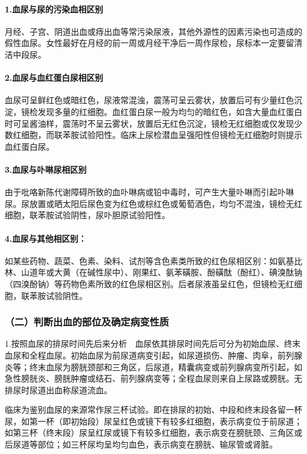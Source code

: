 \paragraph{1.血尿与尿的污染血相区别}

月经、子宫、阴道出血或痔出血等常污染尿液，其他外源性的因素污染也可造成的假性血尿。女性最好在月经的前一周或月经干净后一周作尿检，尿标本一定要留清洁中段尿。

\paragraph{2.血尿与血红蛋白尿相区别}

血尿可呈鲜红色或暗红色，尿液常混浊，震荡可呈云雾状，放置后可有少量红色沉淀，镜检发现多量的红细胞。血红蛋白尿一般为均匀的暗红色，如含大量血红蛋白时可呈酱油样，震荡时不呈云雾状，放置后无红色沉淀，镜检无红细胞或仅发现少数红细胞，而联苯胺试验阳性。临床上尿检潜血呈强阳性但镜检无红细胞时则提示血红蛋白尿。

\paragraph{3.血尿与卟啉尿相区别}

由于吡咯新陈代谢障碍所致的血卟啉病或铅中毒时，可产生大量卟啉而引起卟啉尿。尿放置或晒太阳后尿色变为红色或棕红色或葡萄酒色，均匀不混浊，镜检无红细胞，联苯胺试验阴性，尿卟胆原试验阳性。

\paragraph{4.血尿与其他相区别：}

如某些药物、蔬菜、色素、染料、试剂等含色素类所致的红色尿相区别：如氨基比林、山道年或大黄（在碱性尿中）、刚果红、氨苯磺胺、酚磺酞（酚红）、碘溴酞钠（四溴酚钠）等药物色素所致的红色尿相区别。后者尿液虽呈红色，但镜检无红细胞，联苯胺试验阴性。

\subsubsection{（二）判断出血的部位及确定病变性质}

1.按照血尿的排尿时间先后来分析　血尿依其排尿时间先后可分为初始血尿、终末血尿和全程血尿。初始血尿为前尿道病变引起，如尿道损伤、肿瘤、肉阜，前列腺炎等；终末血尿为膀胱颈部和三角区，后尿道，精囊病变或前列腺病变所引起，如急性膀胱炎、膀胱肿瘤或结石、前列腺病变等；全程血尿则来自上尿路或膀胱。无排尿时尿道出血称尿道流血。

临床为鉴别血尿的来源常作尿三杯试验。即在排尿的初始、中段和终末段各留一杯尿，如第一杯（即初始段）尿呈红色或镜下有较多红细胞，表示病变位于前尿道；如第三杯（终末段）尿呈红尿或镜下有较多红细胞，表示病变在膀胱颈、三角区或后尿道等部位；如三杯尿均呈均匀血色，表示病变在膀胱、输尿管或肾脏。

